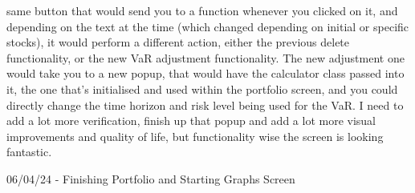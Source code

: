 \documentclass{article}
\begin{document}
same button that would send you to a function whenever you clicked on it, and depending on the text at the time (which changed depending on initial or specific stocks), it would perform a different action, either the previous delete functionality, or the new VaR adjustment functionality. The new adjustment one would take you to a new popup, that would have the calculator class passed into it, the one that's initialised and used within the portfolio screen, and you could directly change the time horizon and risk level being used for the VaR. I need to add a lot more verification, finish up that popup and add a lot more visual improvements and quality of life, but functionality wise the screen is looking fantastic.\\\vspace{0.3cm}

06/04/24 - Finishing Portfolio and Starting Graphs Screen\\
\end{document}
